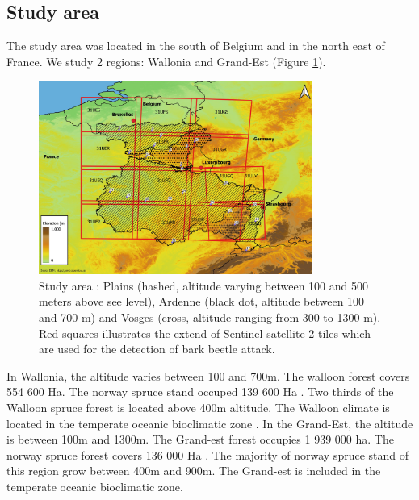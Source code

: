 \documentclass[3p,procedia]{elsarticle}
\begin{document}
\subsection{Study area}
The study area was located in the south of Belgium and in the north east of France. We study 2 regions: Wallonia and Grand-Est (Figure \ref{fig:situ}).
\begin{figure} [htbp] 
	\centering
	\includegraphics[width=0.8\textwidth]{gde.jpeg}
	\caption{Study area : Plains (hashed, altitude varying between 100 and 500 meters above see level), Ardenne (black dot, altitude between 100 and 700 m) and Vosges (cross, altitude ranging from 300 to 1300 m). Red squares illustrates the extend of Sentinel satellite 2 tiles which are used for the detection of bark beetle attack.}
	\label{fig:situ}
\end{figure}
In Wallonia, the altitude varies between 100 and 700m.
The walloon forest covers 554 600 Ha. 
The norway spruce stand occuped 139 600 Ha \citep{Alderweireld_2015}. 
Two thirds of the Walloon spruce forest is located above 400m altitude. 
The Walloon climate is located in the temperate oceanic bioclimatic zone \citep{lindner_climate_2010}. 
In the Grand-Est, the altitude is between 100m and 1300m. 
The Grand-est forest occupies 1 939 000 ha. 
The norway spruce forest covers 136 000 Ha \citep{IGN2022}. 
The majority of norway spruce stand of this region grow between 400m and 900m. 
The Grand-est is included in the temperate oceanic bioclimatic zone\citep{lindner_climate_2010}. 
\end{document}

